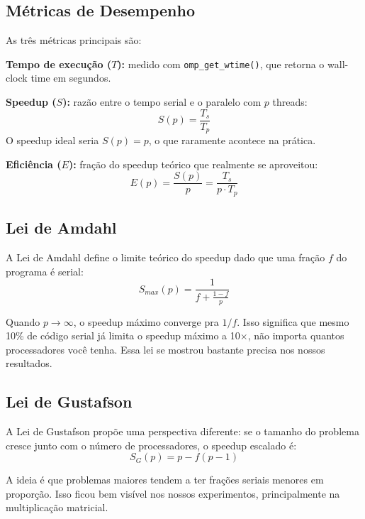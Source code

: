 \documentclass[12pt]{article}
\begin{document}
\subsection{Métricas de Desempenho}

As três métricas principais são:

\textbf{Tempo de execução ($T$):} medido com \texttt{omp\_get\_wtime()}, que retorna o wall-clock time em segundos.

\textbf{Speedup ($S$):} razão entre o tempo serial e o paralelo com $p$ threads:
\begin{equation}
S(p) = \frac{T_s}{T_p}
\end{equation}
O speedup ideal seria $S(p) = p$, o que raramente acontece na prática.

\textbf{Eficiência ($E$):} fração do speedup teórico que realmente se aproveitou:
\begin{equation}
E(p) = \frac{S(p)}{p} = \frac{T_s}{p \cdot T_p}
\end{equation}

\subsection{Lei de Amdahl}

A Lei de Amdahl \cite{amdahl1967} define o limite teórico do speedup dado que uma fração $f$ do programa é serial:
\begin{equation}
S_{max}(p) = \frac{1}{f + \frac{1-f}{p}}
\end{equation}

Quando $p \to \infty$, o speedup máximo converge pra $1/f$. Isso significa que mesmo 10\% de código serial já limita o speedup máximo a 10$\times$, não importa quantos processadores você tenha. Essa lei se mostrou bastante precisa nos nossos resultados.

\subsection{Lei de Gustafson}

A Lei de Gustafson \cite{gustafson1988} propõe uma perspectiva diferente: se o tamanho do problema cresce junto com o número de processadores, o speedup escalado é:
\begin{equation}
S_G(p) = p - f(p - 1)
\end{equation}

A ideia é que problemas maiores tendem a ter frações seriais menores em proporção. Isso ficou bem visível nos nossos experimentos, principalmente na multiplicação matricial.
\end{document}
